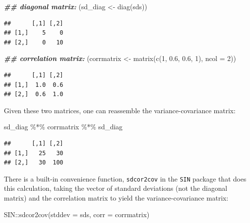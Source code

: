 \documentclass[
  12pt,
]{krantz}
\newenvironment{Shaded}{\begin{snugshade}}{\end{snugshade}}
\newcommand{\AttributeTok}[1]{\textcolor[rgb]{0.77,0.63,0.00}{#1}}
\newcommand{\DecValTok}[1]{\textcolor[rgb]{0.00,0.00,0.81}{#1}}
\newcommand{\DocumentationTok}[1]{\textcolor[rgb]{0.56,0.35,0.01}{\textbf{\textit{#1}}}}
\newcommand{\FloatTok}[1]{\textcolor[rgb]{0.00,0.00,0.81}{#1}}
\newcommand{\FunctionTok}[1]{\textcolor[rgb]{0.00,0.00,0.00}{#1}}
\newcommand{\NormalTok}[1]{#1}
\newcommand{\OtherTok}[1]{\textcolor[rgb]{0.56,0.35,0.01}{#1}}
\newcommand{\SpecialCharTok}[1]{\textcolor[rgb]{0.00,0.00,0.00}{#1}}
\theoremstyle{definition}
\theoremstyle{definition}
\theoremstyle{definition}
\theoremstyle{definition}
\theoremstyle{remark}
\begin{document}
\begin{Shaded}
\begin{Highlighting}[]
\DocumentationTok{\#\# diagonal matrix:}
\NormalTok{(sd\_diag }\OtherTok{\textless{}{-}} \FunctionTok{diag}\NormalTok{(sds))}
\end{Highlighting}
\end{Shaded}

\begin{verbatim}
##      [,1] [,2]
## [1,]    5    0
## [2,]    0   10
\end{verbatim}

\begin{Shaded}
\begin{Highlighting}[]
\DocumentationTok{\#\# correlation matrix:}
\NormalTok{(corrmatrix }\OtherTok{\textless{}{-}} \FunctionTok{matrix}\NormalTok{(}\FunctionTok{c}\NormalTok{(}\DecValTok{1}\NormalTok{, }\FloatTok{0.6}\NormalTok{, }\FloatTok{0.6}\NormalTok{, }\DecValTok{1}\NormalTok{), }\AttributeTok{ncol =} \DecValTok{2}\NormalTok{))}
\end{Highlighting}
\end{Shaded}

\begin{verbatim}
##      [,1] [,2]
## [1,]  1.0  0.6
## [2,]  0.6  1.0
\end{verbatim}

Given these two matrices, one can reassemble the variance-covariance matrix:

\begin{Shaded}
\begin{Highlighting}[]
\NormalTok{sd\_diag }\SpecialCharTok{\%*\%}\NormalTok{ corrmatrix }\SpecialCharTok{\%*\%}\NormalTok{ sd\_diag}
\end{Highlighting}
\end{Shaded}

\begin{verbatim}
##      [,1] [,2]
## [1,]   25   30
## [2,]   30  100
\end{verbatim}

There is a built-in convenience function, \texttt{sdcor2cov} in the \texttt{SIN} package that does this calculation, taking the vector of standard deviations (not the diagonal matrix) and the correlation matrix to yield the variance-covariance matrix:

\begin{Shaded}
\begin{Highlighting}[]
\NormalTok{SIN}\SpecialCharTok{::}\FunctionTok{sdcor2cov}\NormalTok{(}\AttributeTok{stddev =}\NormalTok{ sds, }\AttributeTok{corr =}\NormalTok{ corrmatrix)}
\end{Highlighting}
\end{Shaded}
\end{document}
